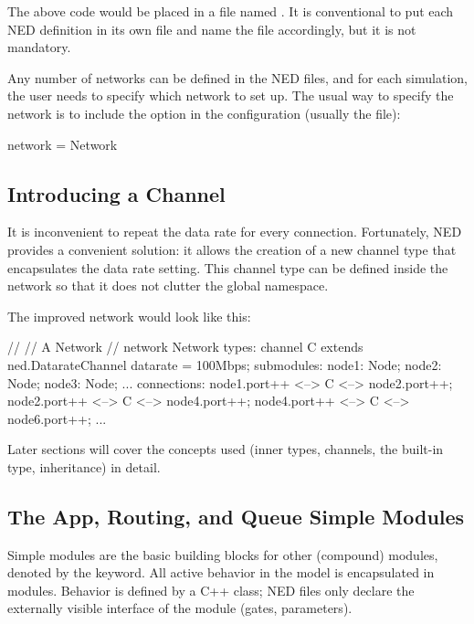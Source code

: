 The above code would be placed in a file named . It is
conventional to put each NED definition in its own file and name the file
accordingly, but it is not mandatory.

Any number of networks can be defined in the NED files, and for each simulation,
the user needs to specify which network to set up. The usual way to specify the
network is to include the  option in the configuration (usually
the  file):

\begin{inifile}
[General]
network = Network
\end{inifile}


\subsection{Introducing a Channel}
\label{sec:ned-lang:warmup:introducing-a-channel}

It is inconvenient to repeat the data rate for every connection. Fortunately,
NED provides a convenient solution: it allows the creation of a new channel type
that encapsulates the data rate setting. This channel type can be defined inside
the network so that it does not clutter the global namespace.

The improved network would look like this:

\begin{ned}
//
// A Network
//
network Network
{
    types:
        channel C extends ned.DatarateChannel {
            datarate = 100Mbps;
        }
    submodules:
        node1: Node;
        node2: Node;
        node3: Node;
        ...
    connections:
        node1.port++ <--> C <--> node2.port++;
        node2.port++ <--> C <--> node4.port++;
        node4.port++ <--> C <--> node6.port++;
        ...
}
\end{ned}

Later sections will cover the concepts used (inner types, channels, the
 built-in type, inheritance) in detail.


\subsection{The App, Routing, and Queue Simple Modules}
\label{sec:ned-lang:warmup:the-simple-modules}

Simple modules are the basic building blocks for other (compound) modules,
denoted by the  keyword. All active behavior in the model is
encapsulated in  modules. Behavior is defined by a C++ class;
NED files only declare the externally visible interface of the module (gates,
parameters).

